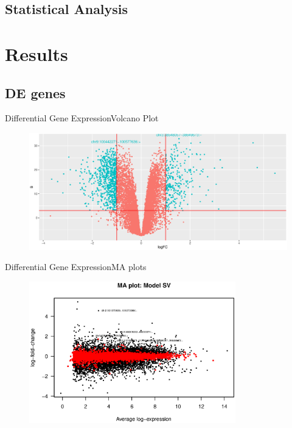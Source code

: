 \documentclass{beamer}
\begin{document}
\subsection{Statistical Analysis}



\section{Results}


\subsection{DE genes}

\begin{frame}{Differential Gene Expression}{Volcano Plot}

   \begin{figure}
        \includegraphics[width=1\textwidth]{Volcano.eps}
    \end{figure}

\end{frame}

\begin{frame}{Differential Gene Expression}{MA plots}

   \begin{figure}
        \includegraphics[width=0.8\textwidth,height=0.8\textheight,keepaspectratio]{MAplot.eps}
    \end{figure}

\end{frame}
\end{document}
